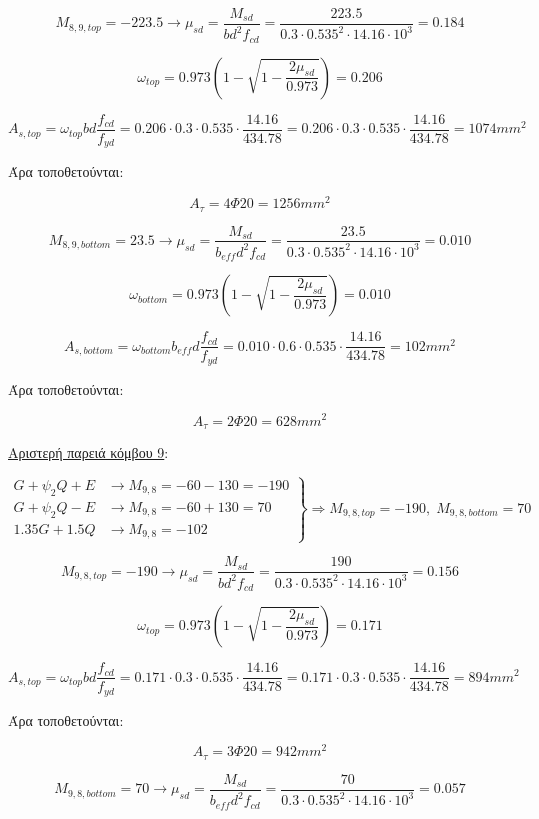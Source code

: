 \[
M_{8,9,top} = -223.5 \rightarrow \mu_{sd} = \dfrac{M_{sd}}{b d^2 f_{cd}} = \dfrac{223.5}{0.3\cdot0.535^2\cdot14.16\cdot10^3} = 0.184
\]

\[
\omega_{top} = 0.973\left( 1 - \sqrt{1 - \dfrac{2\mu_{sd}}{0.973}} \right) = 0.206
\]

\[
A_{s,top} = \omega_{top}b d \dfrac{f_{cd}}{f_{yd}} = 0.206\cdot 0.3 \cdot 0.535 \cdot \dfrac{14.16}{434.78} = 0.206\cdot 0.3 \cdot 0.535 \cdot \dfrac{14.16}{434.78} = 1074mm^2
\]

\noindent
Άρα τοποθετούνται:

\[
A_{\tau} = 4\Phi20 = 1256mm^2
\]

\[
M_{8,9,bottom} = 23.5 \rightarrow \mu_{sd} = \dfrac{M_{sd}}{b_{eff} d^2 f_{cd}} = \dfrac{23.5}{0.3\cdot0.535^2\cdot14.16\cdot10^3} = 0.010
\]

\[
\omega_{bottom} = 0.973\left( 1 - \sqrt{1 - \dfrac{2\mu_{sd}}{0.973}} \right) = 0.010
\]

\[
A_{s,bottom} = \omega_{bottom}b_{eff} d \dfrac{f_{cd}}{f_{yd}} = 0.010\cdot 0.6 \cdot 0.535 \cdot \dfrac{14.16}{434.78} = 102mm^2
\]

\noindent
Άρα τοποθετούνται:

\[
A_{\tau} = 2\Phi20 = 628mm^2
\]


\noindent
\underline{Αριστερή παρειά κόμβου 9}:

\[
\left.
   \begin{array}{ll}
       G+\psi_2 Q + Ε & \rightarrow M_{9,8} = -60-130 = -190 \\
       G+\psi_2 Q - Ε & \rightarrow M_{9,8} = -60+130 = 70 \\
       1.35G + 1.5Q     & \rightarrow M_{9,8} = -102
   \end{array}
\right \} \Rightarrow M_{9,8,top} = -190,\; M_{9,8,bottom} = 70
\]

\[
M_{9,8,top} = -190 \rightarrow \mu_{sd} = \dfrac{M_{sd}}{b d^2 f_{cd}} = \dfrac{190}{0.3\cdot0.535^2\cdot14.16\cdot10^3} = 0.156
\]

\[
\omega_{top} = 0.973\left( 1 - \sqrt{1 - \dfrac{2\mu_{sd}}{0.973}} \right) = 0.171
\]

\[
A_{s,top} = \omega_{top}b d \dfrac{f_{cd}}{f_{yd}} = 0.171\cdot 0.3 \cdot 0.535 \cdot \dfrac{14.16}{434.78} = 0.171\cdot 0.3 \cdot 0.535 \cdot \dfrac{14.16}{434.78} = 894mm^2
\]

\noindent
Άρα τοποθετούνται:

\[
A_{\tau} = 3\Phi20 = 942mm^2
\]

\[
M_{9,8,bottom} = 70 \rightarrow \mu_{sd} = \dfrac{M_{sd}}{b_{eff} d^2 f_{cd}} = \dfrac{70}{0.3\cdot0.535^2\cdot14.16\cdot10^3} = 0.057
\]

